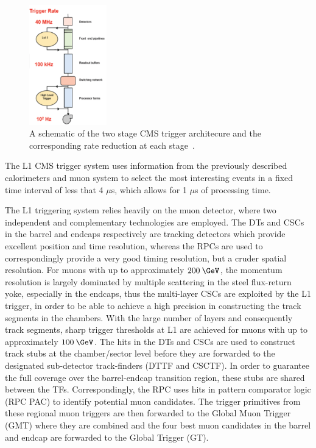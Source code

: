 \begin{figure}
  \centering
  \includegraphics[width=0.3\textwidth]{figs/TriggerRate}
  \caption{A schematic of the two stage CMS trigger architecure and the corresponding rate reduction at each stage~\cite{Halyo:2013iba}.}
  \label{fig:trigger}
\end{figure}

The L1 CMS trigger system uses information from the previously described calorimeters and muon system to select the most interesting events in a fixed time interval of less that 4 $\mu$s, which allows for 1 $\mu$s of processing time.


The L1 triggering system relies heavily on the muon detector, where two independent and complementary technologies are employed. The DTs and CSCs in the barrel and endcaps respectively are tracking detectors which provide excellent position and time resolution, whereas the RPCs are used to correspondingly provide a very good timing resolution, but a cruder spatial resolution. For muons with \pt up to approximately $200\:\GeV$, the momentum resolution is largely dominated by multiple scattering in the steel flux-return yoke, especially in the endcaps, thus the multi-layer CSCs are exploited by the L1 trigger, in order to be able to achieve a high precision in constructing the track segments in the chambers. With the large number of layers and consequently track segments, sharp \pt trigger thresholds at L1 are achieved for muons with \pt up to approximately $100\:\GeV$.  The hits in the DTs and CSCs are used to construct track stubs at the chamber/sector level before they are forwarded to the designated sub-detector track-finders (DTTF and CSCTF). In order to guarantee the full coverage over the barrel-endcap transition region, these stubs are shared between the TFs. Correspondingly, the RPC uses hits in pattern comparator logic (RPC PAC) to identify potential muon candidates. The trigger primitives from these regional muon triggers are then forwarded to the Global Muon Trigger (GMT) where they are combined and the four best muon candidates in the barrel and endcap are forwarded to the Global Trigger (GT). 

